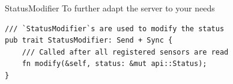 \begin{frame}[fragile]{StatusModifier}
    To further adapt the server to your needs
    \begin{verbatim}
/// `StatusModifier`s are used to modify the status
pub trait StatusModifier: Send + Sync {
    /// Called after all registered sensors are read
    fn modify(&self, status: &mut api::Status);
}
    \end{verbatim}
\end{frame}

